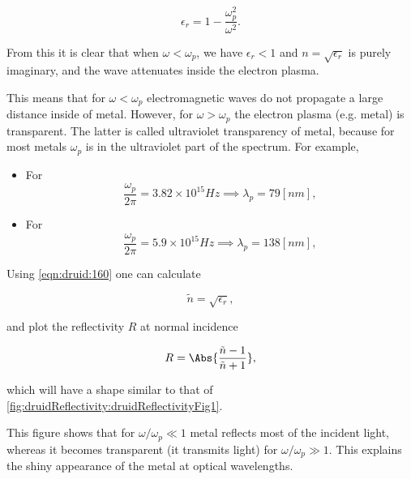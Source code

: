 \begin{dmath}\label{eqn:druid:160}
\epsilon_r = 1 - \frac{\omega_p^2}{\omega^2}.
\end{dmath}

From this it is clear that when \( \omega < \omega_p \), we have \( \epsilon_r < 1 \) and \( n = \sqrt{\epsilon_r} \) is purely imaginary, and the wave attenuates inside the electron plasma.

This means that for \( \omega < \omega_p \) electromagnetic waves do not propagate a large distance inside of metal.  However, for \( \omega > \omega_p \) the electron plasma (e.g. metal) is transparent.  The latter is called ultraviolet transparency of metal, because for most metals \( \omega_p \) is in the ultraviolet part of the spectrum.  For example,

\begin{itemize}
\item For 
\begin{dmath}\label{eqn:druid:180}
\frac{\omega_p}{2 \pi} = 3.82 \times 10^{15} \si{Hz} \implies \lambda_p = 79 [nm],
\end{dmath}
\item For 
\begin{dmath}\label{eqn:druid:200}
\frac{\omega_p}{2 \pi} = 5.9 \times 10^{15} \si{Hz} \implies \lambda_p = 138 [nm],
\end{dmath}
\end{itemize}

Using \cref{eqn:druid:160} one can calculate

\begin{dmath}\label{eqn:druid:220}
\tilde{n} = \sqrt{\epsilon_r},
\end{dmath}

and plot the reflectivity \( R \) at normal incidence

\begin{dmath}\label{eqn:druid:240}
R = \Abs{ \frac{\tilde{n} - 1 }{\tilde{n} + 1} },
\end{dmath}

which will have a shape similar to that of \cref{fig:druidReflectivity:druidReflectivityFig1}.


This figure shows that for \( \omega/\omega_p \ll 1 \) metal reflects most of the incident light, whereas it becomes transparent (it transmits light) for \( \omega/\omega_p \gg 1 \).  This explains the shiny appearance of the metal at optical wavelengths.

